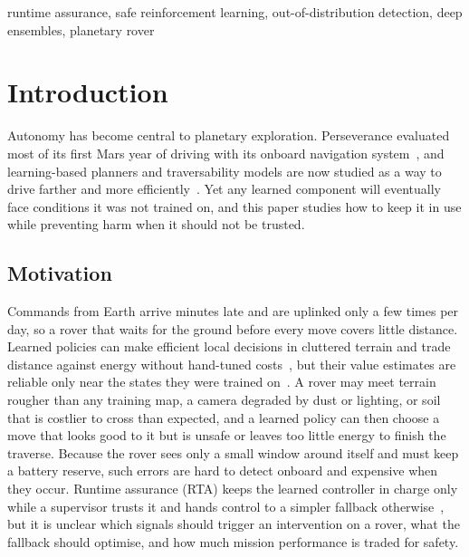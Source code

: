 \documentclass[conference]{IEEEtran}
\begin{document}
\begin{IEEEkeywords}
runtime assurance, safe reinforcement learning, out-of-distribution detection, deep ensembles, planetary rover
\end{IEEEkeywords}

\section{Introduction}
Autonomy has become central to planetary exploration. Perseverance evaluated most of its first Mars year of driving
with its onboard navigation system~\cite{verma2023perseverance}, and learning-based planners and traversability models
are now studied as a way to drive farther and more efficiently~\cite{daftry2022mlnav,endo2023risk,miao2025review}.
Yet any learned component will eventually face conditions it was not trained on, and this paper studies how to keep
it in use while preventing harm when it should not be trusted.

\subsection{Motivation}
Commands from Earth arrive minutes late and are uplinked only a few times per day, so a rover that waits for the ground
before every move covers little distance. Learned policies can make efficient local decisions in cluttered terrain and
trade distance against energy without hand-tuned costs~\cite{tanaka2024lunar}, but their value estimates are reliable
only near the states they were trained on~\cite{kirk2023generalisation}. A rover may meet terrain rougher than any
training map, a camera degraded by dust or lighting, or soil that is costlier to cross than expected, and a learned
policy can then choose a move that looks good to it but is unsafe or leaves too little energy to finish the traverse.
Because the rover sees only a small window around itself and must keep a battery reserve, such errors are hard to detect
onboard and expensive when they occur. Runtime assurance (RTA) keeps the learned controller in charge only while a
supervisor trusts it and hands control to a simpler fallback otherwise~\cite{hobbs2023rta,wabersich2023safety}, but it is
unclear which signals should trigger an intervention on a rover, what the fallback should optimise, and how much mission
performance is traded for safety.
\end{document}
